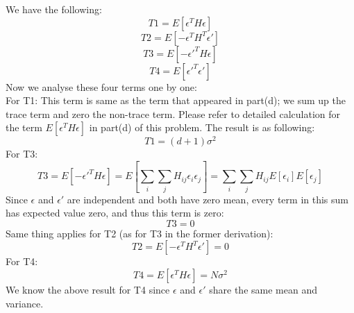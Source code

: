 \documentclass[12pt]{article}
\begin{document}
We have the following:
$$T1=E[\epsilon^TH\epsilon]$$
$$T2=E[-\epsilon^TH^T\epsilon']$$
$$T3=E[-\epsilon'^TH\epsilon]$$
$$T4=E[\epsilon'^T\epsilon']$$
Now we analyse these four terms one by one:\\
For T1:
This term is same as the term that appeared in part(d); we sum up the trace term and zero the non-trace term. Please refer to detailed calculation for the term $E[\epsilon^TH\epsilon]$ in part(d) of this problem. The result is as following:
$$T1=(d+1)\sigma^2$$
For T3:
$$T3=E[-\epsilon'^TH\epsilon]=E[\sum_i\sum_jH_{ij}\epsilon_i\epsilon_j]=\sum_i\sum_jH_{ij}E[\epsilon_i]E[\epsilon_j]$$
Since $\epsilon$ and $\epsilon'$ are independent and both have zero mean, every term in this sum has expected value zero, and thus this term is zero:
$$T3=0$$
Same thing applies for T2 (as for T3 in the former derivation):
$$T2=E[-\epsilon^TH^T\epsilon']=0$$
For T4:
$$T4=E[\epsilon^TH\epsilon]=N\sigma^2$$
We know the above result for T4 since $\epsilon$ and $\epsilon'$ share the same mean and variance.\\
\end{document}
